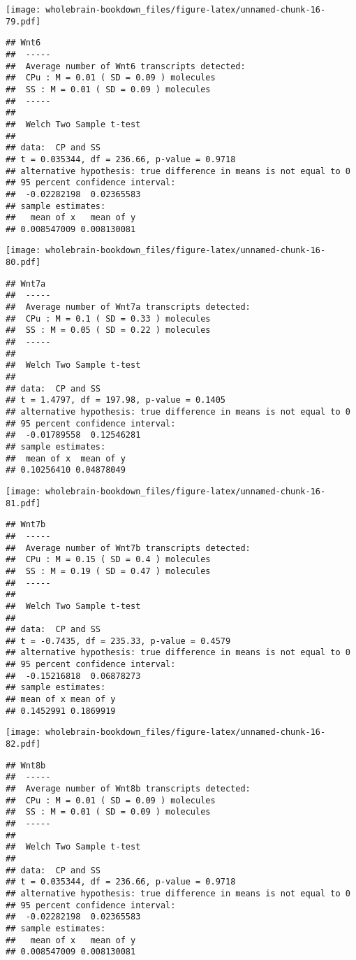 \documentclass[]{book}
\theoremstyle{definition}
\theoremstyle{definition}
\theoremstyle{remark}
\begin{document}
\texttt{[image: wholebrain-bookdown\_files/figure-latex/unnamed-chunk-16-79.pdf]}

\begin{verbatim}
## Wnt6
##  -----
##  Average number of Wnt6 transcripts detected:
##  CPu : M = 0.01 ( SD = 0.09 ) molecules 
##  SS : M = 0.01 ( SD = 0.09 ) molecules
##  -----
## 
##  Welch Two Sample t-test
## 
## data:  CP and SS
## t = 0.035344, df = 236.66, p-value = 0.9718
## alternative hypothesis: true difference in means is not equal to 0
## 95 percent confidence interval:
##  -0.02282198  0.02365583
## sample estimates:
##   mean of x   mean of y 
## 0.008547009 0.008130081
\end{verbatim}

\texttt{[image: wholebrain-bookdown\_files/figure-latex/unnamed-chunk-16-80.pdf]}

\begin{verbatim}
## Wnt7a
##  -----
##  Average number of Wnt7a transcripts detected:
##  CPu : M = 0.1 ( SD = 0.33 ) molecules 
##  SS : M = 0.05 ( SD = 0.22 ) molecules
##  -----
## 
##  Welch Two Sample t-test
## 
## data:  CP and SS
## t = 1.4797, df = 197.98, p-value = 0.1405
## alternative hypothesis: true difference in means is not equal to 0
## 95 percent confidence interval:
##  -0.01789558  0.12546281
## sample estimates:
##  mean of x  mean of y 
## 0.10256410 0.04878049
\end{verbatim}

\texttt{[image: wholebrain-bookdown\_files/figure-latex/unnamed-chunk-16-81.pdf]}

\begin{verbatim}
## Wnt7b
##  -----
##  Average number of Wnt7b transcripts detected:
##  CPu : M = 0.15 ( SD = 0.4 ) molecules 
##  SS : M = 0.19 ( SD = 0.47 ) molecules
##  -----
## 
##  Welch Two Sample t-test
## 
## data:  CP and SS
## t = -0.7435, df = 235.33, p-value = 0.4579
## alternative hypothesis: true difference in means is not equal to 0
## 95 percent confidence interval:
##  -0.15216818  0.06878273
## sample estimates:
## mean of x mean of y 
## 0.1452991 0.1869919
\end{verbatim}

\texttt{[image: wholebrain-bookdown\_files/figure-latex/unnamed-chunk-16-82.pdf]}

\begin{verbatim}
## Wnt8b
##  -----
##  Average number of Wnt8b transcripts detected:
##  CPu : M = 0.01 ( SD = 0.09 ) molecules 
##  SS : M = 0.01 ( SD = 0.09 ) molecules
##  -----
## 
##  Welch Two Sample t-test
## 
## data:  CP and SS
## t = 0.035344, df = 236.66, p-value = 0.9718
## alternative hypothesis: true difference in means is not equal to 0
## 95 percent confidence interval:
##  -0.02282198  0.02365583
## sample estimates:
##   mean of x   mean of y 
## 0.008547009 0.008130081
\end{verbatim}
\end{document}
